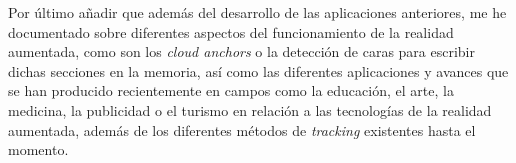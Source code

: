Por último añadir que además del desarrollo de las aplicaciones anteriores, me he documentado sobre diferentes aspectos del funcionamiento de la realidad aumentada, como son los \textit{cloud anchors} o la detección de caras para escribir dichas secciones en la memoria, así como las diferentes aplicaciones y avances que se han producido recientemente en campos como la educación, el arte, la medicina, la publicidad o el turismo en relación a las tecnologías de la realidad aumentada, además de los diferentes métodos de \textit{tracking} existentes hasta el momento.\\

\noindent